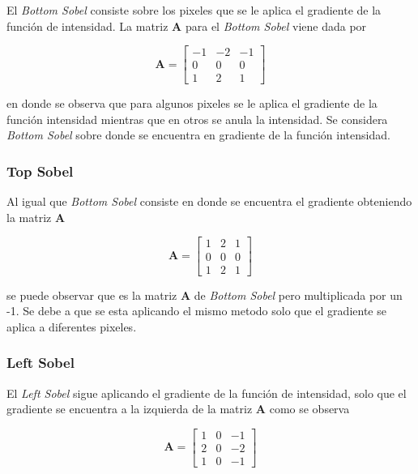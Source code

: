 El \textit{Bottom Sobel} consiste sobre los pixeles que se le aplica el gradiente de la función de intensidad. La matriz \textbf{A} para el \textit{Bottom Sobel} viene dada por

\begin{equation}
\textbf{A}=\begin{bmatrix}
-1 &-2 &-1\\
0 &0 &0\\
1 &2 &1
\end{bmatrix}
\end{equation}

en donde se observa que para algunos pixeles se le aplica el gradiente de la función intensidad mientras que en otros se anula la intensidad. Se considera \textit{Bottom Sobel} sobre donde se encuentra en gradiente de la función intensidad.

\subsubsection{Top Sobel}

Al igual que \textit{Bottom Sobel} consiste en donde se encuentra el gradiente obteniendo la matriz \textbf{A}

\begin{equation}
\textbf{A}=\begin{bmatrix}
1 &2 &1\\
0 &0 &0\\
1 &2 &1
\end{bmatrix}
\end{equation}

se puede observar que es la matriz \textbf{A} de \textit{Bottom Sobel} pero multiplicada por un -1. Se debe a que se esta aplicando el mismo metodo solo que el gradiente se aplica a diferentes pixeles.

\subsubsection{Left Sobel}

El \textit{Left Sobel} sigue aplicando el gradiente de la función de intensidad, solo que el gradiente se encuentra a la izquierda de la matriz \textbf{A} como se observa

\begin{equation}
\textbf{A}=\begin{bmatrix}
1 &0 &-1\\
2 &0 &-2\\
1 &0 &-1
\end{bmatrix}
\end{equation}

